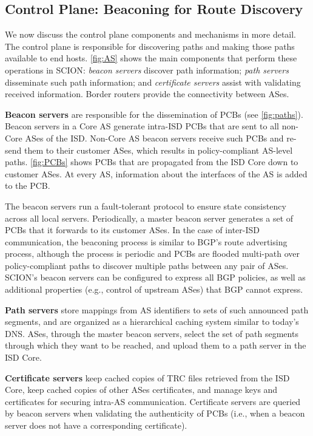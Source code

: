 \documentclass[a4paper]{llncs}
\newcommand\SCION{{\small\textsf{SCION}}\xspace}
\begin{document}
\subsection{Control Plane: Beaconing for Route Discovery}

We now discuss the control plane components and mechanisms in more
detail. The control plane is responsible for discovering paths and
making those paths available to end hosts. \autoref{fig:AS} shows the
main components that perform these operations in \SCION:
\emph{beacon servers} discover path information; \emph{path
servers} disseminate such path information; and \emph{certificate servers} assist with validating received information. Border routers provide the connectivity between ASes.

\textbf{Beacon servers} are responsible for the dissemination of PCBs
(see \autoref{fig:paths}). Beacon servers in a Core AS generate
intra-ISD PCBs that are sent to all non-Core ASes of the ISD.
Non-Core AS beacon servers receive such PCBs and re-send them to
their customer ASes, which results in policy-compliant AS-level paths.
\autoref{fig:PCBs} shows PCBs that are propagated from the ISD Core
down to customer ASes. At every AS, information about the interfaces
of the AS is added to the PCB.

The beacon servers run a fault-tolerant protocol to ensure state
consistency across all local servers. Periodically, a master beacon server
generates a set of PCBs that it forwards to its customer ASes. In the case of
inter-ISD communication, the beaconing process is similar to BGP's route advertising process,
although the process is periodic and PCBs are flooded multi-path over
policy-compliant paths to discover multiple paths between any pair of ASes.
\SCION{}'s beacon servers can be configured to express all BGP policies, as well
as additional properties (e.g., control of upstream ASes) that BGP cannot
express.

\textbf{Path servers} store mappings from AS identifiers to sets of such
announced path segments, and are organized as a hierarchical caching system similar to
today's DNS. ASes, through the master beacon servers, select the set of path segments
through which they want to be reached, and upload them to a path server in the
ISD Core.

\textbf{Certificate servers} keep cached copies of TRC files retrieved from the
ISD Core, keep cached copies of other ASes certificates, and manage keys and certificates for
securing intra-AS communication. Certificate servers are queried by beacon
servers when validating the authenticity of PCBs (i.e., when a beacon server does not have
a corresponding certificate).
\end{document}
